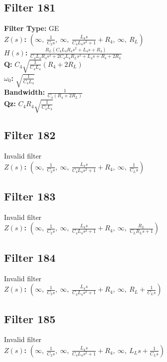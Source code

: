 \documentclass{article}
\begin{document}
\subsection*{Filter 181}
\textbf{Filter Type:} GE \\ 
\textbf{$Z(s)$:} $\left( \infty, \  \frac{1}{C_{2} s}, \  \infty, \  \frac{L_{4} s}{C_{4} L_{4} s^{2} + 1} + R_{4}, \  \infty, \  R_{L}\right)$ \\ 
\textbf{$H(s)$:} $\frac{R_{L} \left(C_{4} L_{4} R_{4} s^{2} + L_{4} s + R_{4}\right)}{C_{4} L_{4} R_{4} s^{2} + 2 C_{4} L_{4} R_{L} s^{2} + L_{4} s + R_{4} + 2 R_{L}}$ \\ 
\textbf{Q:} $C_{4} \sqrt{\frac{1}{C_{4} L_{4}}} \left(R_{4} + 2 R_{L}\right)$ \\ 
\textbf{$\omega_0$:} $\sqrt{\frac{1}{C_{4} L_{4}}}$ \\ 
\textbf{Bandwidth:} $\frac{1}{C_{4} \left(R_{4} + 2 R_{L}\right)}$ \\ 
\textbf{Qz:} $C_{4} R_{4} \sqrt{\frac{1}{C_{4} L_{4}}}$ \\ 
\subsection*{Filter 182}
Invalid filter \\ 
\textbf{$Z(s)$:} $\left( \infty, \  \frac{1}{C_{2} s}, \  \infty, \  \frac{L_{4} s}{C_{4} L_{4} s^{2} + 1} + R_{4}, \  \infty, \  \frac{1}{C_{L} s}\right)$ \\ 
\subsection*{Filter 183}
Invalid filter \\ 
\textbf{$Z(s)$:} $\left( \infty, \  \frac{1}{C_{2} s}, \  \infty, \  \frac{L_{4} s}{C_{4} L_{4} s^{2} + 1} + R_{4}, \  \infty, \  \frac{R_{L}}{C_{L} R_{L} s + 1}\right)$ \\ 
\subsection*{Filter 184}
Invalid filter \\ 
\textbf{$Z(s)$:} $\left( \infty, \  \frac{1}{C_{2} s}, \  \infty, \  \frac{L_{4} s}{C_{4} L_{4} s^{2} + 1} + R_{4}, \  \infty, \  R_{L} + \frac{1}{C_{L} s}\right)$ \\ 
\subsection*{Filter 185}
Invalid filter \\ 
\textbf{$Z(s)$:} $\left( \infty, \  \frac{1}{C_{2} s}, \  \infty, \  \frac{L_{4} s}{C_{4} L_{4} s^{2} + 1} + R_{4}, \  \infty, \  L_{L} s + \frac{1}{C_{L} s}\right)$ \\ 
\end{document}
